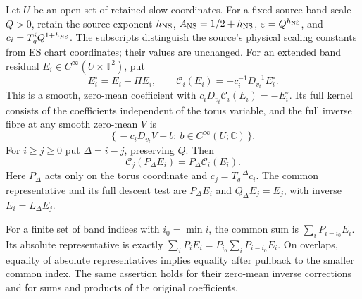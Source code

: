 \begin{theorem}
\label{thm:ns-reverse-mean-correction}
Let $U$ be an open set of retained slow coordinates. For a
fixed source band scale $Q>0$, retain the source exponent
$h_{\rm NS}$, $A_{\rm NS}=1/2+h_{\rm NS}$,
$\varepsilon=Q^{h_{\rm NS}}$, and
$c_i=T_g^iQ^{1+h_{\rm NS}}$. The subscripts distinguish the
source's physical scaling constants from ES chart coordinates;
their values are unchanged. For an extended band residual
$E_i\in C^\infty(U\times\mathbb T^2)$, put
\[
 E_i^\circ=E_i-\Pi E_i,\qquad
 \mathcal C_i(E_i)=-c_i^{-1}D_{v_t}^{-1}E_i^\circ.
\]
This is a smooth, zero-mean coefficient with
$c_iD_{v_t}\mathcal C_i(E_i)=-E_i^\circ$.
Its full kernel consists of the coefficients independent of the
torus variable, and the full inverse fibre at any smooth
zero-mean $V$ is
\[
 \{\,-c_iD_{v_t}V+b:\ b\in C^\infty(U;\mathbb C)\,\}.
\]
For $i\ge j\ge0$ put $\Delta=i-j$, preserving $Q$. Then
\[
 \mathcal C_j(P_\Delta E_i)=P_\Delta\mathcal C_i(E_i).
\]
Here $P_\Delta$ acts only on the torus coordinate and
$c_j=T_g^{-\Delta}c_i$. The common representative and its
full descent test are $P_\Delta E_i$ and
$Q_\Delta E_j=E_j$, with inverse $E_i=L_\Delta E_j$.

For a finite set of band indices with $i_0=\min i$, the common
sum is $\sum_iP_{i-i_0}E_i$. Its absolute representative is
exactly $\sum_iP_iE_i=P_{i_0}\sum_iP_{i-i_0}E_i$.
On overlaps, equality of absolute representatives implies
equality after pullback to the smaller common index. The same
assertion holds for their zero-mean inverse corrections and
for sums and products of the original coefficients.
\end{theorem}
